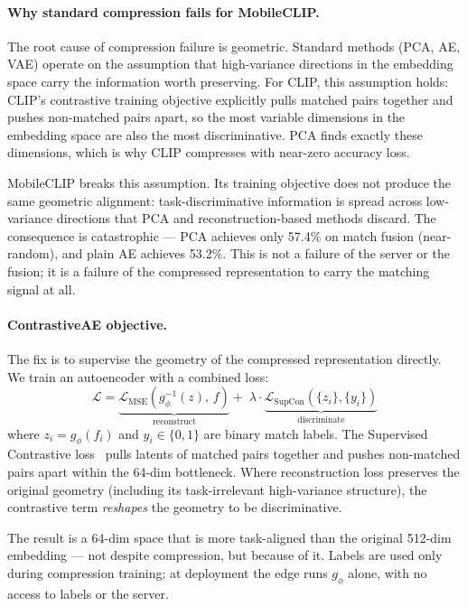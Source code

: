 \documentclass[10pt,twocolumn]{article}
\begin{document}
\paragraph{Why standard compression fails for MobileCLIP.}
The root cause of compression failure is geometric. Standard methods
(PCA, AE, VAE) operate on the assumption that high-variance directions
in the embedding space carry the information worth preserving. For CLIP,
this assumption holds: CLIP's contrastive training objective explicitly
pulls matched pairs together and pushes non-matched pairs apart, so the
most variable dimensions in the embedding space are also the most
discriminative. PCA finds exactly these dimensions, which is why
CLIP compresses with near-zero accuracy loss.

MobileCLIP breaks this assumption. Its training objective does not
produce the same geometric alignment: task-discriminative information
is spread across low-variance directions that PCA and reconstruction-based
methods discard. The consequence is catastrophic --- PCA achieves only
57.4\% on match fusion (near-random), and plain AE achieves 53.2\%.
This is not a failure of the server or the fusion; it is a failure of
the compressed representation to carry the matching signal at all.

\paragraph{ContrastiveAE objective.}
The fix is to supervise the geometry of the compressed representation
directly. We train an autoencoder with a combined loss:
\begin{equation}
\mathcal{L} = \underbrace{\mathcal{L}_\text{MSE}(g_\phi^{-1}(z),\, f)}_{\text{reconstruct}}
            + \;\lambda \cdot \underbrace{\mathcal{L}_\text{SupCon}(\{z_i\}, \{y_i\})}_{\text{discriminate}}
\label{eq:cae}
\end{equation}
where $z_i = g_\phi(f_i)$ and $y_i \in \{0,1\}$ are binary match labels.
The Supervised Contrastive loss~\cite{khosla2020supcon} pulls latents
of matched pairs together and pushes non-matched pairs apart within the
64-dim bottleneck. Where reconstruction loss preserves the original
geometry (including its task-irrelevant high-variance structure),
the contrastive term \emph{reshapes} the geometry to be discriminative.

The result is a 64-dim space that is more task-aligned than the
original 512-dim embedding --- not despite compression, but because of it.
Labels are used only during compression training; at deployment the edge
runs $g_\phi$ alone, with no access to labels or the server.
\end{document}
